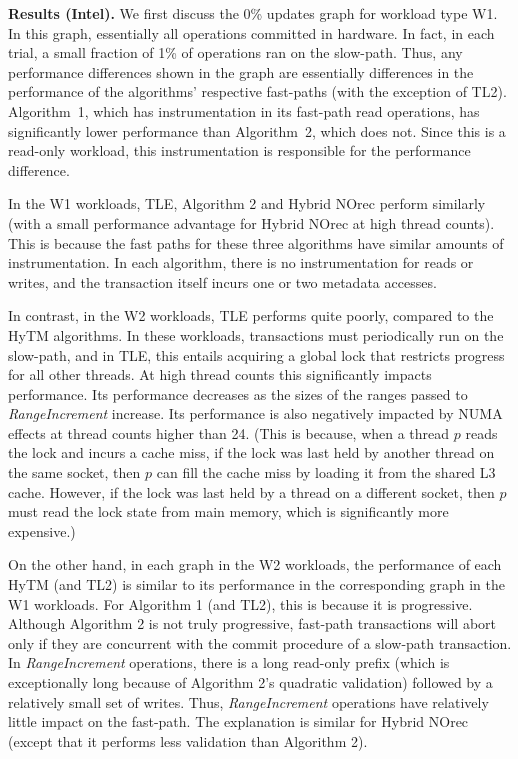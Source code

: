 \vspace{1mm}\noindent\textbf{Results (Intel).}
We first discuss the 0\% updates graph for workload type W1.
In this graph, essentially all operations committed in hardware.
In fact, in each trial, a small fraction of 1\% of operations ran on the slow-path.
Thus, any performance differences shown in the graph are essentially differences in the performance of the algorithms' respective fast-paths (with the exception of TL2).
Algorithm~1, which has instrumentation in its fast-path read operations, has significantly lower performance than Algorithm~2, which does not.
Since this is a read-only workload, this instrumentation is responsible for the performance difference.

In the W1 workloads, TLE, Algorithm 2 and Hybrid NOrec perform similarly (with a small performance advantage for Hybrid NOrec at high thread counts).
This is because the fast paths for these three algorithms have similar amounts of instrumentation.
In each algorithm, there is no instrumentation for reads or writes, 
and the transaction itself incurs one or two metadata accesses.

In contrast, in the W2 workloads, TLE performs quite poorly, compared to the HyTM algorithms.
In these workloads, transactions must periodically run on the slow-path, and in TLE, 
this entails acquiring a global lock that restricts progress for all other threads.
At high thread counts this significantly impacts performance.
Its performance decreases as the sizes of the ranges passed to \textit{RangeIncrement} increase.
Its performance is also negatively impacted by NUMA effects at thread counts higher than 24.
(This is because, when a thread $p$ reads the lock and incurs a cache miss, 
if the lock was last held by another thread on the same socket, 
then $p$ can fill the cache miss by loading it from the shared L3 cache.
However, if the lock was last held by a thread on a different socket, 
then $p$ must read the lock state from main memory, which is significantly more expensive.)

On the other hand, in each graph in the W2 workloads, the performance of each HyTM (and TL2) is similar to its performance in the corresponding graph in the W1 workloads.
For Algorithm 1 (and TL2), this is because it is progressive.
Although Algorithm 2 is not truly progressive, fast-path transactions will abort only if they are concurrent with the commit procedure of a slow-path transaction.
In \textit{RangeIncrement} operations, there is a long read-only prefix (which is exceptionally long because of Algorithm 2's quadratic validation) followed by a relatively small set of writes.
Thus, \textit{RangeIncrement} operations have relatively little impact on the fast-path.
The explanation is similar for Hybrid NOrec (except that it performs less validation than Algorithm 2).

